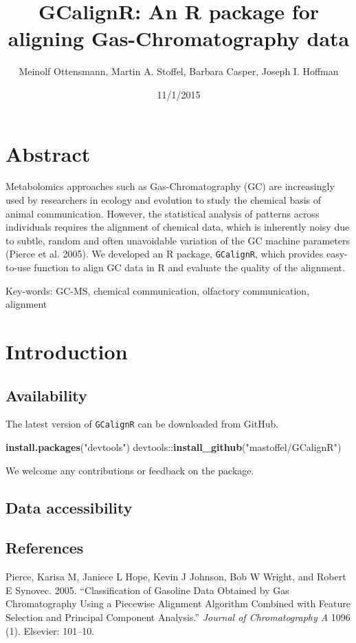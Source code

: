 \documentclass[]{article}
\title{GCalignR: An R package for aligning Gas-Chromatography data}
\author{Meinolf Ottensmann, Martin A. Stoffel, Barbara Casper, Joseph I. Hoffman}
\date{11/1/2015}
\newenvironment{Shaded}{}{}
\newcommand{\KeywordTok}[1]{\textbf{{#1}}}
\newcommand{\StringTok}[1]{\textcolor[rgb]{0.87,0.00,0.00}{{#1}}}
\newcommand{\NormalTok}[1]{{#1}}
\begin{document}
\maketitle

\section{Abstract}\label{abstract}

Metabolomics approaches such as Gas-Chromatography (GC) are increasingly
used by researchers in ecology and evolution to study the chemical basis
of animal communication. However, the statistical analysis of patterns
across individuals requires the alignment of chemical data, which is
inherently noisy due to subtle, random and often unavoidable variation
of the GC machine parameters (Pierce et al. 2005). We developed an R
package, \texttt{GCalignR}, which provides easy-to-use function to align
GC data in R and evaluate the quality of the alignment.

Key-words: GC-MS, chemical communication, olfactory communication,
alignment

\section{Introduction}\label{introduction}

\subsection{Availability}\label{availability}

The latest version of \texttt{GCalignR} can be downloaded from GitHub.

\begin{Shaded}
\begin{Highlighting}[]
\KeywordTok{install.packages}\NormalTok{(}\StringTok{"devtools"}\NormalTok{)}
\NormalTok{devtools::}\KeywordTok{install_github}\NormalTok{(}\StringTok{"mastoffel/GCalignR"}\NormalTok{)}
\end{Highlighting}
\end{Shaded}

We welcome any contributions or feedback on the package.

\subsection{Data accessibility}\label{data-accessibility}

\subsection*{References}\label{references}

\hypertarget{refs}{}
\hypertarget{ref-pierce2005classification}{}
Pierce, Karisa M, Janiece L Hope, Kevin J Johnson, Bob W Wright, and
Robert E Synovec. 2005. ``Classification of Gasoline Data Obtained by
Gas Chromatography Using a Piecewise Alignment Algorithm Combined with
Feature Selection and Principal Component Analysis.'' \emph{Journal of
Chromatography A} 1096 (1). Elsevier: 101--10.
\end{document}
